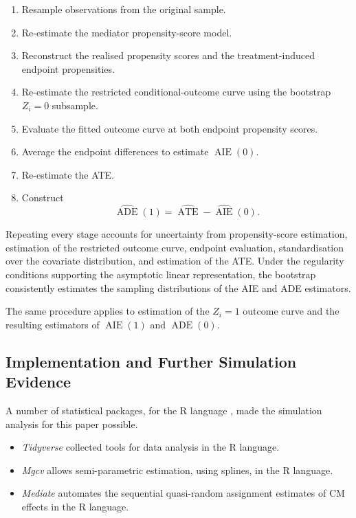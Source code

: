 \begin{enumerate}[label=\textbf{(\arabic*)}]

    \item
    Resample observations from the original sample.

    \item
    Re-estimate the mediator propensity-score model.

    \item
    Reconstruct the realised propensity scores and the treatment-induced endpoint propensities.

    \item
    Re-estimate the restricted conditional-outcome curve using the bootstrap $Z_i=0$ subsample.

    \item
    Evaluate the fitted outcome curve at both endpoint propensity scores.

    \item
    Average the endpoint differences to estimate $\operatorname{AIE}(0)$.

    \item
    Re-estimate the ATE.

    \item
    Construct
    \[
        \widehat{\operatorname{ADE}}(1)
        =
        \widehat{\operatorname{ATE}}
        -
        \widehat{\operatorname{AIE}}(0).
    \]

\end{enumerate}

Repeating every stage accounts for uncertainty from propensity-score estimation, estimation of the restricted outcome curve, endpoint evaluation, standardisation over the covariate distribution, and estimation of the ATE.
Under the regularity conditions supporting the asymptotic linear representation, the bootstrap consistently estimates the sampling distributions of the AIE and ADE estimators.

The same procedure applies to estimation of the $Z_i=1$ outcome curve and the resulting estimators of $\operatorname{AIE}(1)$ and $\operatorname{ADE}(0)$.


\subsection{Implementation and Further Simulation Evidence}
\label{appendix:implement}
A number of statistical packages, for the R language \citep{R2023}, made the simulation analysis for this paper possible.
\begin{itemize}
    \item \textit{Tidyverse} \citep{tidyverse} collected tools for data analysis in the R language.
    \item \textit{Mgcv} \citep{wood2016mgcv} allows semi-parametric estimation, using splines, in the R language.
    \item \textit{Mediate} \citep{tingley2014mediation} automates the sequential quasi-random assignment estimates of CM effects \citep{imai2010identification} in the R language.
\end{itemize}

